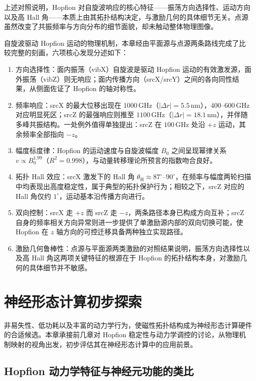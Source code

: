 \documentclass{article}
\begin{document}
上述对照说明，Hopfion 对自旋波响应的核心特征——振荡方向选择性、运动方向以及高 Hall 角——本质上由其拓扑结构决定，与激励几何的具体细节无关。点源虽然改变了共振频率与方向分布的细节面貌，却未触动整体物理图像。


自旋波驱动 Hopfion 运动的物理机制，本章经由平面源与点源两条路线完成了比较完整的刻画，六项核心发现分述如下：

\begin{enumerate}
  \item 方向选择性：面内振荡（vibX）自旋波是驱动 Hopfion 运动的有效激发源，面外振荡（vibZ）则无响应；面内传播方向（srcX/srcY）之间的各向同性结果，从侧面佐证了 Hopfion 的轴对称性。
  \item 频率响应：srcX 的最大位移出现在 $1000\,\mathrm{GHz}$（$|\Delta r| = 5.5\,\mathrm{nm}$），$400\text{--}600\,\mathrm{GHz}$ 对应明显死区；srcZ 的最强响应则推至 $1100\,\mathrm{GHz}$（$|\Delta r| = 18.1\,\mathrm{nm}$），并伴随多峰共振结构。一处例外值得单独提出：srcZ 在 $100\,\mathrm{GHz}$ 处沿 $+z$ 运动，其余频率全部指向 $-z$。
  \item 幅度标度律：Hopfion 的运动速度与自旋波幅度 $B_0$ 之间呈现幂律关系 $v \propto B_0^{1.99}$（$R^2 = 0.998$），与动量转移理论所预言的指数吻合良好。
  \item 拓扑 Hall 效应：srcX 激发下的 Hall 角 $\theta_{\text{H}} \approx 87^{\circ}$--$90^{\circ}$，在频率与幅度两轮扫描中均表现出高度稳定性，属于典型的拓扑保护行为；相较之下，srcZ 对应的 Hall 角仅约 $1^{\circ}$，运动基本沿传播方向进行。
  \item 双向控制：srcX 走 $+z$ 而 srcZ 走 $-z$，两条路径本身已构成方向互补；srcZ 自身的频率相关方向异常则进一步提供了单激励源内部的双向切换可能，使 Hopfion 在 $z$ 轴方向的可控迁移具备两种独立实现路径。
  \item 激励几何鲁棒性：点源与平面源两类激励的对照结果说明，振荡方向选择性以及高 Hall 角这两项关键特征的根源在于 Hopfion 的拓扑结构本身，对激励几何的具体细节并不敏感。
\end{enumerate}

\chapter{神经形态计算初步探索}

非易失性、低功耗以及丰富的动力学行为，使磁性拓扑结构成为神经形态计算硬件的合适候选。本章承接前几章对 Hopfion 稳定性与动力学调控的讨论，从物理机制映射的视角出发，初步评估其在神经形态计算中的应用前景。


\section{Hopfion 动力学特征与神经元功能的类比}
\end{document}
